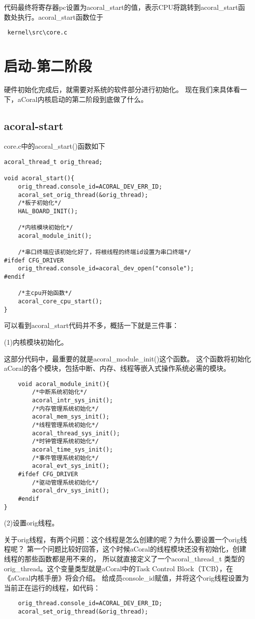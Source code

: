 代码最终将寄存器pc设置为acoral\_start的值，表示CPU将跳转到acoral\_start函数处执行。acoral\_start函数位于
\begin{lstlisting}
 kernel\src\core.c
\end{lstlisting}

\section{启动-第二阶段}

硬件初始化完成后，就需要对系统的软件部分进行初始化。
现在我们来具体看一下，aCoral内核启动的第二阶段到底做了什么。

\subsection{acoral-start}
core.c中的acoral\_start()函数如下
\begin{lstlisting}
acoral_thread_t orig_thread;

void acoral_start(){
	orig_thread.console_id=ACORAL_DEV_ERR_ID;
	acoral_set_orig_thread(&orig_thread);
	/*板子初始化*/
	HAL_BOARD_INIT();

	/*内核模块初始化*/
	acoral_module_init();

	/*串口终端应该初始化好了，将根线程的终端id设置为串口终端*/
#ifdef CFG_DRIVER
	orig_thread.console_id=acoral_dev_open("console");
#endif

	/*主cpu开始函数*/
	acoral_core_cpu_start();
}
\end{lstlisting}

可以看到acoral\_start代码并不多，概括一下就是三件事：

(1)内核模块初始化。

这部分代码中，最重要的就是acoral\_module\_init()这个函数。
这个函数将初始化aCoral的各个模块，包括中断、内存、线程等嵌入式操作系统必需的模块。
\begin{lstlisting}
	void acoral_module_init(){
		/*中断系统初始化*/
		acoral_intr_sys_init();
		/*内存管理系统初始化*/
		acoral_mem_sys_init();
		/*线程管理系统初始化*/
		acoral_thread_sys_init();
		/*时钟管理系统初始化*/
		acoral_time_sys_init();
		/*事件管理系统初始化*/
		acoral_evt_sys_init();
	#ifdef CFG_DRIVER
		/*驱动管理系统初始化*/
		acoral_drv_sys_init();
	#endif
}
\end{lstlisting}

(2)设置orig线程。

关于orig线程，有两个问题：这个线程是怎么创建的呢？为什么要设置一个orig线程呢？
第一个问题比较好回答，这个时候aCoral的线程模块还没有初始化，创建线程的那些函数都是用不来的，
所以就直接定义了一个acoral\_thread\_t 类型的orig\_thread。这个变量类型就是aCoral中的Task Control Block（TCB），在《aCoral内核手册》将会介绍。 
给成员console\_id赋值，并将这个orig线程设置为当前正在运行的线程，如代码：
\begin{lstlisting}
	orig_thread.console_id=ACORAL_DEV_ERR_ID;
	acoral_set_orig_thread(&orig_thread);
\end{lstlisting}

